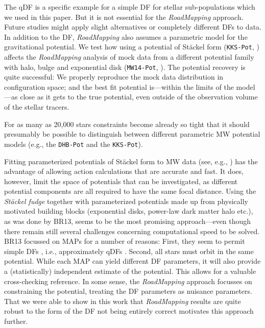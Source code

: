 \documentclass[iop,revtex4,numberedappendix,appendixfloats]{emulateapj}
\newcommand{\MAP}{MAP}
\newcommand{\MAPs}{MAPs}
\newcommand{\RM}{{\sl RoadMapping}}
\begin{document}
The qDF is a specific example for a simple DF for stellar sub-populations which we used in this paper. But it is not essential for the \RM{} approach. Future studies might apply slight alternatives or completely different DFs to data.\\

 In addition to the DF, \RM{} also assumes a parametric model for the gravitational potential. We test how using a potential of St\"{a}ckel form (\texttt{KKS-Pot}, \citealt{1994AA...287...43B}) affects the \RM{} analysis of mock data from a different potential family with halo, bulge and exponential disk (\texttt{MW14-Pot}, \citealt{2015ApJS..216...29B}). The potential recovery is quite successful: We properly reproduce the mock data distribution in configuration space; and the best fit potential is---within the limits of the model---as close as it gets to the true potential, even outside of the observation volume of the stellar tracers. 

For as many as 20,000 stars constraints become already so tight that it should presumably be possible to distinguish between different parametric MW potential models (e.g., the \texttt{DHB-Pot} and the \texttt{KKS-Pot}).

Fitting parameterized potentials of St\"{a}ckel form to MW data (see, e.g., \citealt{1994AA...287...43B,2003MNRAS.340..752F}) has the advantage of allowing action calculations that are accurate and fast. It does, however, limit the space of potentials that can be investigated, as different potential components are all required to have the same focal distance. Using the \emph{St\"{a}ckel fudge} \citep{2012MNRAS.426.1324B} together with parameterized potentials made up from physically motivated building blocks (exponential disks, power-law dark matter halo etc.), as was done by BR13, seems to be the most promising approach---even though there remain still several challenges concerning computational speed to be solved.\\

 BR13 focussed on \MAPs{} for a number of reasons: First, they seem to permit simple DFs \citep{2012ApJ...751..131B,2012ApJ...755..115B,2012ApJ...753..148B}, i.e., approximately qDFs \citep{2013MNRAS.434..652T}. Second, all stars must orbit in the same potential. While each \MAP{} can yield different DF parameters, it will also provide a (statistically) independent estimate of the potential. This allows for a valuable cross-checking reference. In some sense, the \RM{} approach focusses on constraining the potential, treating the DF parameters as nuisance parameters. That we were able to show in this work that \RM{} results are quite robust to the form of the DF not being entirely correct motivates this approach further. 
\end{document}
